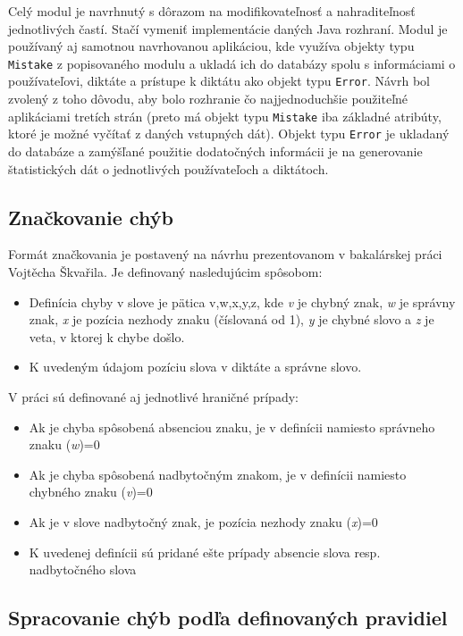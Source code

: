 \documentclass[12pt,oneside]{fithesis2}
\begin{document}
      \par Celý modul je navrhnutý s dôrazom na modifikovateľnosť a nahraditeľnosť jednotlivých častí. Stačí vymeniť implementácie daných Java rozhraní. Modul je používaný aj samotnou navrhovanou aplikáciou, kde využíva objekty typu \texttt{Mistake} z popisovaného modulu a ukladá ich do databázy spolu s informáciami o používateľovi, diktáte a prístupe k diktátu ako objekt typu \texttt{Error}. Návrh bol zvolený z toho dôvodu, aby bolo rozhranie čo najjednoduchšie použiteľné aplikáciami tretích strán (preto má objekt typu \texttt{Mistake} iba základné atribúty, ktoré je možné vyčítať z daných vstupných dát). Objekt typu \texttt{Error} je ukladaný do databáze a zamýšľané použitie dodatočných informácii je na generovanie štatistických dát o jednotlivých používateľoch a diktátoch.
      
      \subsection{Značkovanie chýb}
      \par Formát značkovania je postavený na návrhu prezentovanom v bakalárskej práci Vojtěcha Škvařila\cite{skvaril14}. Je definovaný nasledujúcim spôsobom:
      \begin{itemize}
	\item Definícia chyby v slove je pätica v,w,x,y,z, kde \textit{v} je chybný znak, \textit{w} je správny znak, \textit{x} je pozícia nezhody znaku (číslovaná od 1), \textit{y} je chybné slovo a \textit{z} je veta, v ktorej k chybe došlo.
	\item K uvedeným údajom pozíciu slova v diktáte a správne slovo.
	\end{itemize}

V práci sú definované aj jednotlivé hraničné prípady:	
	
	 \begin{itemize}
	\item Ak je chyba spôsobená absenciou znaku, je v definícii namiesto správneho znaku (\textit{w})=0
	\item Ak je chyba spôsobená nadbytočným znakom, je v definícii namiesto chybného znaku (\textit{v})=0
	\item Ak je v slove nadbytočný znak, je pozícia nezhody znaku (\textit{x})=0
	\item K uvedenej definícii sú pridané ešte prípady absencie slova resp. nadbytočného slova
\end{itemize}

      \subsection{Spracovanie chýb podľa definovaných pravidiel}	      
      
\end{document}
